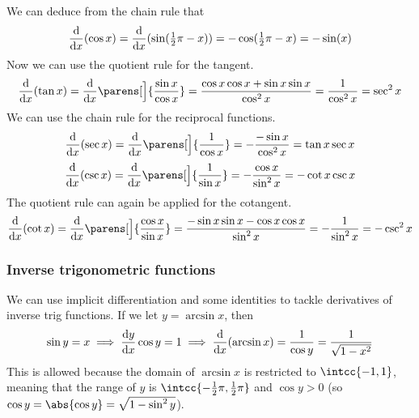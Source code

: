 We can deduce from the chain rule that
\begin{equation*}
 \dv{x}(\cos x) = \dv{x}(\sin(\tfrac 12 \pi - x))
                = -\cos(\tfrac 12 \pi - x) = -\sin(x)
\end{equation*}
Now we can use the quotient rule for the tangent.
\begin{equation*}
 \dv{x}(\tan x) = \dv{x}\parens[\Big]{\frac{\sin x}{\cos x}}
                = \frac{\cos x \cos x + \sin x \sin x}{\cos^2 x}
                = \frac 1{\cos^2 x} = \sec^2 x
\end{equation*}
We can use the chain rule for the reciprocal functions.
\begin{equation*}
 \dv{x}(\sec x) = \dv{x}\parens[\Big]{\frac 1{\cos x}}
                = -\frac{-\sin x}{\cos^2 x} = \tan x \sec x
\end{equation*}
\begin{equation*}
 \dv{x}(\csc x) = \dv{x}\parens[\Big]{\frac 1{\sin x}}
                = -\frac{\cos x}{\sin^2 x} = -\cot x \csc x
\end{equation*}
The quotient rule can again be applied for the cotangent.
\begin{equation*}
 \dv{x}(\cot x) = \dv{x}\parens[\Big]{\frac{\cos x}{\sin x}}
                = \frac{-\sin x \sin x - \cos x \cos x}{\sin^2 x}
                = -\frac 1{\sin^2 x} = -\csc^2 x
\end{equation*}

\subsubsection{Inverse trigonometric functions} \label{sec_calc_trig_inv}

We can use implicit differentiation and some identities to tackle
derivatives of inverse trig functions. If we let \(y = \arcsin x\), then
\begin{equation*}
 \sin y = x \implies \dv<y>{x} \cos y = 1
     \implies \dv{x}(\arcsin x) = \frac 1{\cos y} = \frac 1{\sqrt{1 - x^2}}
\end{equation*}
This is allowed because the domain of \(\arcsin x\) is restricted to
\(\intcc{-1, 1}\), meaning that the range of \(y\) is
\(\intcc{-\frac 12 \pi, \frac 12 \pi}\) and \(\cos y > 0\)
(so \(\cos y = \abs{\cos y} = \sqrt{1 - \sin^2 y}\)).

